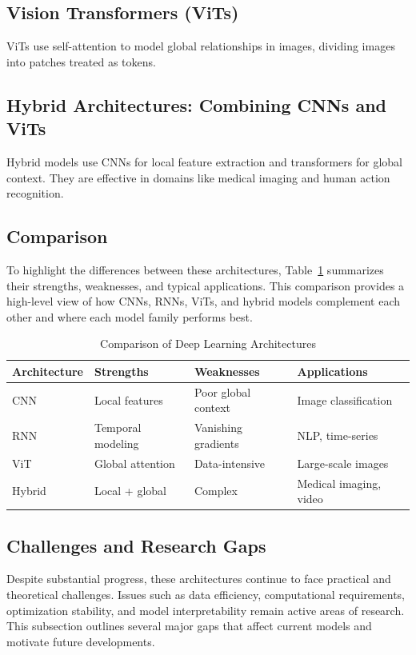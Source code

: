 \documentclass[12pt]{article}
\begin{document}
\subsection{Vision Transformers (ViTs)}
ViTs use self-attention to model global relationships in images, dividing images into patches treated as tokens.

\subsection{Hybrid Architectures: Combining CNNs and ViTs}
Hybrid models use CNNs for local feature extraction and transformers for global context. They are effective in domains like medical imaging and human action recognition.

\newpage
\subsection{Comparison}
To highlight the differences between these architectures, Table~\ref{tab:architecture_comparison}
summarizes their strengths, weaknesses, and typical applications. This
comparison provides a high-level view of how CNNs, RNNs, ViTs, and hybrid
models complement each other and where each model family performs best.
\begin{table}[htbp]
\centering
\renewcommand{\arraystretch}{1.3} 
\setlength{\tabcolsep}{10pt} 
\begin{tabular}{|l|l|l|l|}
\hline
\textbf{Architecture} & \textbf{Strengths} & \textbf{Weaknesses} & \textbf{Applications} \\
\hline
CNN & Local features & Poor global context & Image classification \\
RNN & Temporal modeling & Vanishing gradients & NLP, time-series \\
ViT & Global attention & Data-intensive & Large-scale images \\
Hybrid & Local + global & Complex & Medical imaging, video \\
\hline
\end{tabular}
\caption{Comparison of Deep Learning Architectures}
\label{tab:architecture_comparison}
\end{table}

\subsection{Challenges and Research Gaps}
Despite substantial progress, these architectures continue to face practical
and theoretical challenges. Issues such as data efficiency, computational
requirements, optimization stability, and model interpretability remain
active areas of research. This subsection outlines several major gaps that
affect current models and motivate future developments.
\end{document}
